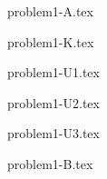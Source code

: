 \documentclass{article}
\begin{document}
{problem1-A.tex}

{problem1-K.tex}

{problem1-U1.tex}

{problem1-U2.tex}

{problem1-U3.tex}

{problem1-B.tex}
\end{document}

